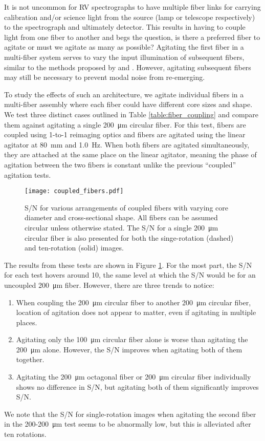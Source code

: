 \documentclass[twocolumn]{emulateapj}
\begin{document}
It is not uncommon for RV spectrographs to have multiple fiber links for carrying calibration and/or science light from the source (lamp or telescope respectively) to the spectrograph and ultimately detector. This results in having to couple light from one fiber to another and begs the question, is there a preferred fiber to agitate or must we agitate as many as possible? Agitating the first fiber in a multi-fiber system serves to vary the input illumination of subsequent fibers, similar to the methods proposed by \citet{Mahadevan2014} and \citet{Halverson2014}. However, agitating subsequent fibers may still be necessary to prevent modal noise from re-emerging.

To study the effects of such an architecture, we agitate individual fibers in a multi-fiber assembly where each fiber could have different core sizes and shape. We test three distinct cases outlined in Table \ref{table:fiber_coupling} and compare them against agitating a single \SI{200}{\micro\meter} circular fiber. For this test, fibers are coupled using 1-to-1 reimaging optics and fibers are agitated using the linear agitator at \SI{80}{\milli\meter} and \SI{1.0}{\hertz}. When both fibers are agitated simultaneously, they are attached at the same place on the linear agitator, meaning the phase of agitation between the two fibers is constant unlike the previous ``coupled'' agitation tests.

\begin{figure}
\centering
	\texttt{[image: coupled\_fibers.pdf]}
	\caption{S/N for various arrangements of coupled fibers with varying core diameter and cross-sectional shape. All fibers can be assumed circular unless otherwise stated. The S/N for a single \SI{200}{\micro\meter} circular fiber is also presented for both the singe-rotation (dashed) and ten-rotation (solid) images.}
\label{fig:coupled_fibers}
\end{figure}

The results from these tests are shown in Figure \ref{fig:coupled_fibers}. For the most part, the S/N for each test hovers around 10, the same level at which the S/N would be for an uncoupled \SI{200}{\micro\meter} fiber. However, there are three trends to notice:
\begin{enumerate}
\item When coupling the \SI{200}{\micro\meter} circular fiber to another \SI{200}{\micro\meter} circular fiber, location of agitation does not appear to matter, even if agitating in multiple places.
\item Agitating only the \SI{100}{\micro\meter} circular fiber alone is worse than agitating the \SI{200}{\micro\meter} alone. However, the S/N improves when agitating both of them together.
\item Agitating the \SI{200}{\micro\meter} octagonal fiber or \SI{200}{\micro\meter} circular fiber individually shows no difference in S/N, but agitating both of them significantly improves S/N.
\end{enumerate}
We note that the S/N for single-rotation images when agitating the second fiber in the 200-\SI{200}{\micro\meter} test seems to be abnormally low, but this is alleviated after ten rotations.
\end{document}
